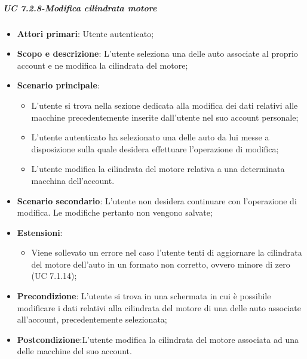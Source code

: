             \subparagraph{UC 7.2.8-Modifica cilindrata motore}
            \begin{itemize}
                \item \textbf{Attori primari}: Utente autenticato;
                
                \item \textbf{Scopo e descrizione}: L'utente seleziona una delle auto associate al proprio account e ne modifica la cilindrata del motore; 
                \item \textbf{Scenario principale}:
                    \begin{itemize}
                        \item L'utente si trova nella sezione dedicata alla modifica dei dati relativi alle macchine precedentemente inserite dall'utente nel suo account personale;
                        \item L'utente autenticato ha selezionato una delle auto da lui messe a disposizione sulla quale desidera effettuare l'operazione di modifica;
                        \item L'utente modifica la cilindrata del motore relativa a una determinata macchina dell'account.
                    \end{itemize}
                \item \textbf{Scenario secondario}: L'utente non desidera continuare con l'operazione di modifica. Le modifiche pertanto non vengono salvate;
                \item \textbf{Estensioni}:
                    \begin{itemize}
                        \item Viene sollevato un errore nel caso l'utente tenti di aggiornare la cilindrata del motore dell'auto in un formato non corretto, ovvero minore di zero (UC 7.1.14); 
                    \end{itemize}
                \item \textbf{Precondizione}: L'utente si trova in una schermata in cui è possibile modificare i dati relativi alla cilindrata del motore di una delle auto associate all'account, precedentemente selezionata;
                \item \textbf{Postcondizione}:L'utente modifica la cilindrata del motore associata ad una delle macchine del suo account.
            \end{itemize}
                 
                 
                 

